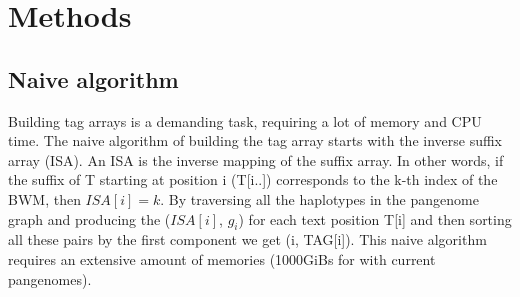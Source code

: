 \documentclass[11pt]{ucthesis}
\begin{document}
\section{Methods}

\subsection{Naive algorithm}

Building tag arrays is a demanding task, requiring a lot of memory and CPU time. The naive algorithm of building the tag array starts with the inverse suffix array (ISA). An ISA is the inverse mapping of the suffix array. In other words, if the suffix of T starting at position i (T[i..]) corresponds to the k-th index of the BWM, then $ISA[i]=k$. By traversing all the haplotypes in the pangenome graph and producing the ($ISA[i]$, $g_i$) for each text position T[i] and then sorting all these pairs by the first component we get (i, TAG[i]). This naive algorithm requires an extensive amount of memories (1000GiBs for with current pangenomes).  
\end{document}
